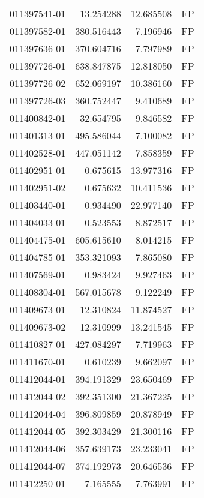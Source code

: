 \begin{tabular}{lrrl}
011397541-01 &   13.254288 &      12.685508 &   FP \\
011397582-01 &  380.516443 &       7.196946 &   FP \\
011397636-01 &  370.604716 &       7.797989 &   FP \\
011397726-01 &  638.847875 &      12.818050 &   FP \\
011397726-02 &  652.069197 &      10.386160 &   FP \\
011397726-03 &  360.752447 &       9.410689 &   FP \\
011400842-01 &   32.654795 &       9.846582 &   FP \\
011401313-01 &  495.586044 &       7.100082 &   FP \\
011402528-01 &  447.051142 &       7.858359 &   FP \\
011402951-01 &    0.675615 &      13.977316 &   FP \\
011402951-02 &    0.675632 &      10.411536 &   FP \\
011403440-01 &    0.934490 &      22.977140 &   FP \\
011404033-01 &    0.523553 &       8.872517 &   FP \\
011404475-01 &  605.615610 &       8.014215 &   FP \\
011404785-01 &  353.321093 &       7.865080 &   FP \\
011407569-01 &    0.983424 &       9.927463 &   FP \\
011408304-01 &  567.015678 &       9.122249 &   FP \\
011409673-01 &   12.310824 &      11.874527 &   FP \\
011409673-02 &   12.310999 &      13.241545 &   FP \\
011410827-01 &  427.084297 &       7.719963 &   FP \\
011411670-01 &    0.610239 &       9.662097 &   FP \\
011412044-01 &  394.191329 &      23.650469 &   FP \\
011412044-02 &  392.351300 &      21.367225 &   FP \\
011412044-04 &  396.809859 &      20.878949 &   FP \\
011412044-05 &  392.303429 &      21.300116 &   FP \\
011412044-06 &  357.639173 &      23.233041 &   FP \\
011412044-07 &  374.192973 &      20.646536 &   FP \\
011412250-01 &    7.165555 &       7.763991 &   FP \\

\end{tabular}
